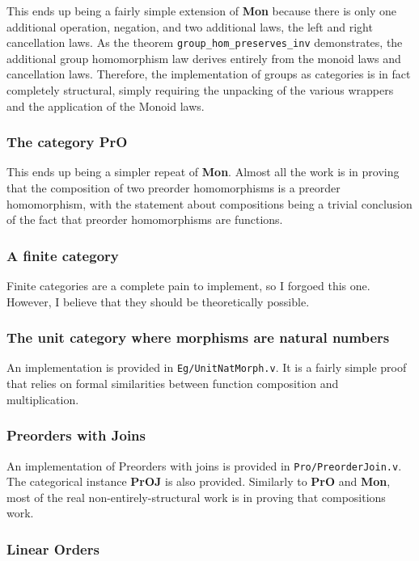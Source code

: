 \documentclass[12pt,twocolumn,oneside]{book}
\begin{document}
This ends up being a fairly simple extension of \textbf{Mon} because there is only
one additional operation, negation, and two additional laws, the left and right
cancellation laws. As the theorem \texttt{group\_hom\_preserves\_inv} demonstrates,
the additional group homomorphism law derives entirely from the monoid laws and
cancellation laws. Therefore, the implementation of groups as categories is in
fact completely structural, simply requiring the unpacking of the various wrappers
and the application of the Monoid laws.

\subsubsection{The category \textbf{PrO}}

This ends up being a simpler repeat of \textbf{Mon}. Almost all the work is in
proving that the composition of two preorder homomorphisms is a preorder
homomorphism, with the statement about compositions being a trivial conclusion of
the fact that preorder homomorphisms are functions.

\subsubsection{A finite category}

Finite categories are a complete pain to implement, so I forgoed this one. However,
I believe that they should be theoretically possible.

\subsubsection{The unit category where morphisms are natural numbers}

An implementation is provided in \texttt{Eg/UnitNatMorph.v}. It is a fairly simple
proof that relies on formal similarities between function composition and multiplication.

\subsubsection{Preorders with Joins}

An implementation of Preorders with joins is provided in \texttt{Pro/PreorderJoin.v}.
The categorical instance \textbf{PrOJ} is also provided. Similarly to \textbf{PrO}
and \textbf{Mon}, most of the real non-entirely-structural work is in proving that
compositions work.

\subsubsection{Linear Orders}
\end{document}

